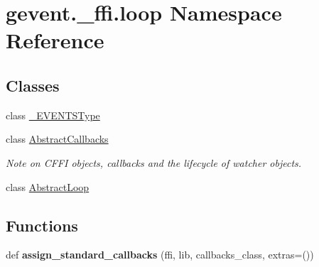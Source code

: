 \hypertarget{namespacegevent_1_1__ffi_1_1loop}{}\section{gevent.\+\_\+ffi.\+loop Namespace Reference}
\label{namespacegevent_1_1__ffi_1_1loop}
\subsection*{Classes}
\begin{DoxyCompactItemize}
\item 
class \hyperlink{classgevent_1_1__ffi_1_1loop_1_1___e_v_e_n_t_s_type}{\+\_\+\+E\+V\+E\+N\+T\+S\+Type}
\item 
class \hyperlink{classgevent_1_1__ffi_1_1loop_1_1_abstract_callbacks}{Abstract\+Callbacks}
\begin{DoxyCompactList}\small\item\em Note on C\+F\+FI objects, callbacks and the lifecycle of watcher objects. \end{DoxyCompactList}\item 
class \hyperlink{classgevent_1_1__ffi_1_1loop_1_1_abstract_loop}{Abstract\+Loop}
\end{DoxyCompactItemize}
\subsection*{Functions}
\begin{DoxyCompactItemize}
\item 
\mbox{\label{namespacegevent_1_1__ffi_1_1loop_a6d7fb33dac608af6945b1130fb0bbdc4}} 
def {\bfseries assign\+\_\+standard\+\_\+callbacks} (ffi, lib, callbacks\+\_\+class, extras=())
\end{DoxyCompactItemize}
